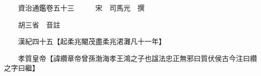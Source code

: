 










 


 
 


 

  
  
  
  
  





  
  
  
  
  
 
  

  

  
  
  



  

 
 

  
   




  

  
  


  　　資治通鑑卷五十三　　　宋　司馬光　撰

　　胡三省　音註

　　漢紀四十五【起柔兆閹茂盡柔兆涒灘凡十一年】

　　孝質皇帝【諱纘章帝曾孫渤海孝王鴻之子也諡法忠正無邪曰質伏侯古今注曰纘之字曰繼】

